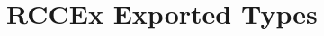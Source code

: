 \hypertarget{group___r_c_c_ex___exported___types}{}\section{R\+C\+C\+Ex Exported Types}
\label{group___r_c_c_ex___exported___types}
